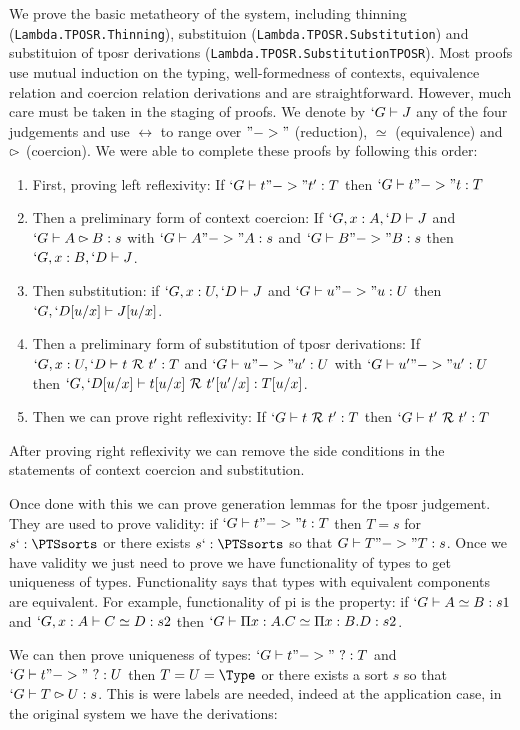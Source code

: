 \documentclass[11pt]{article}
\def\TPOSR{{\sc tposr}\xspace}
\def\coqmodule#1{\texttt{#1}}
\begin{document}
We prove the basic metatheory of the system, including thinning
 (\coqmodule{Lambda.TPOSR.Thinning}), substituion
(\coqmodule{Lambda.TPOSR.Substitution}) and
substituion of \TPOSR derivations
(\coqmodule{Lambda.TPOSR.SubstitutionTPOSR}). Most proofs use mutual
induction on the typing, well-formedness of contexts, equivalence
relation and coercion relation derivations and are
straightforward. 
However, much care must be taken in the staging of
proofs. We denote by $`G \vdash J$ any of the four judgements and use
$\rel$ to range over $"->"$ (reduction), $\simeq$ (equivalence) and $\rightslice$ (coercion).
We were able to complete these proofs by following this order:
\begin{enumerate}
\item First, proving left reflexivity:
  If $`G \vdash t "->" t' : T$ then $`G \vdash t "->" t : T$
\item Then a preliminary form of context coercion:
  If $`G, x : A, `D \vdash J$ and $`G \vdash A \rightslice B : s$ 
  with $`G \vdash A "->" A : s$ and $`G \vdash B "->" B : s$ then
  $`G, x : B, `D \vdash J$.
\item Then substitution: if $`G, x : U, `D \vdash J$ and $`G \vdash u
  "->" u : U$ then $`G, `D[u/x] \vdash J[u/x]$.
\item Then a preliminary form of substitution of \TPOSR derivations:
  If $`G, x : U, `D \vdash t~\mathcal{R}~t' : T$ and $`G \vdash u "->" u' : U$
  with $`G \vdash u' "->" u' : U$ 
  then $`G, `D[u/x] \vdash t[u/x]~\mathcal{R}~t'[u'/x] : T[u/x]$.
\item Then we can prove right reflexivity:
  If $`G \vdash t~\mathcal{R}~t' : T$ then $`G \vdash t'~\mathcal{R}~t' : T$
\end{enumerate}
   
After proving right reflexivity we can remove the side conditions in the
statements of context coercion and substitution.

Once done with this we can prove generation lemmas for the \TPOSR judgement.
They are used to prove validity: if $`G \vdash t "->" t : T$ then $T = s$
for $s `: \PTSsorts$ or there exists $s `: \PTSsorts$ so that $G \vdash T
"->" T : s$. Once we have validity we just need to prove we have
functionality of types to get uniqueness of types. Functionality says
that types with equivalent components are equivalent. For example,
functionality of pi is the property:
if $`G \vdash A \simeq B : s1$ and $`G, x : A \vdash C \simeq D : s2$ then
$`G \vdash \Pi x : A.C \simeq \Pi x : B.D : s2$.

We can then prove uniqueness of types: $`G \vdash t "->"~? : T$ and $`G
\vdash t "->"~? : U$ then $T = U = \Type$ or there exists a sort $s$ so
that $`G \vdash T \rightslice U : s$. This is were labels are needed, indeed at
the application case, in the original system we have the derivations:
\end{document}
